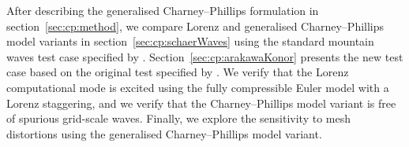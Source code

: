 After describing the generalised Charney--Phillips formulation in section~\ref{sec:cp:method}, we compare Lorenz and generalised Charney--Phillips model variants in section~\ref{sec:cp:schaerWaves} using the standard mountain waves test case specified by \citet{schaer2002}.
Section~\ref{sec:cp:arakawaKonor} presents the new test case based on the original test specified by \citet{arakawa-konor1996}.
We verify that the Lorenz computational mode is excited using the fully compressible Euler model with a Lorenz staggering, and we verify that the Charney--Phillips model variant is free of spurious grid-scale waves.  Finally, we explore the sensitivity to mesh distortions using the generalised Charney--Phillips model variant.





